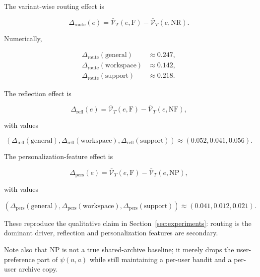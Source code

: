 \documentclass{article} %
\begin{document}
The variant-wise routing effect is

\begin{equation}
\label{eq:app-routing-effect}
\Delta_{\mathrm{route}}(e) = \bar{\mathcal{V}}_T(e,\mathrm{F}) - \bar{\mathcal{V}}_T(e,\mathrm{NR}).
\end{equation}

Numerically,

\begin{align}
\label{eq:app-routing-numbers}
\Delta_{\mathrm{route}}(\mathrm{general}) &\approx 0.247,\\
\Delta_{\mathrm{route}}(\mathrm{workspace}) &\approx 0.142,\\
\Delta_{\mathrm{route}}(\mathrm{support}) &\approx 0.218.
\end{align}

The reflection effect is

\begin{equation}
\label{eq:app-reflection-effect}
\Delta_{\mathrm{refl}}(e) = \bar{\mathcal{V}}_T(e,\mathrm{F}) - \bar{\mathcal{V}}_T(e,\mathrm{NF}),
\end{equation}

with values

\begin{equation}
\label{eq:app-reflection-numbers}
(\Delta_{\mathrm{refl}}(\mathrm{general}),\Delta_{\mathrm{refl}}(\mathrm{workspace}),\Delta_{\mathrm{refl}}(\mathrm{support}))
\approx (0.052, 0.041, 0.056).
\end{equation}

The personalization-feature effect is

\begin{equation}
\label{eq:app-pers-effect}
\Delta_{\mathrm{pers}}(e) = \bar{\mathcal{V}}_T(e,\mathrm{F}) - \bar{\mathcal{V}}_T(e,\mathrm{NP}),
\end{equation}

with values

\begin{equation}
\label{eq:app-pers-numbers}
(\Delta_{\mathrm{pers}}(\mathrm{general}),\Delta_{\mathrm{pers}}(\mathrm{workspace}),\Delta_{\mathrm{pers}}(\mathrm{support}))
\approx (0.041, 0.012, 0.021).
\end{equation}

These reproduce the qualitative claim in Section~\ref{sec:experiments}: routing is the dominant driver, reflection and personalization features are secondary.

Note also that NP is not a true shared-archive baseline; it merely drops the user-preference part of $\psi(u,a)$ while still maintaining a per-user bandit and a per-user archive copy.
\end{document}
